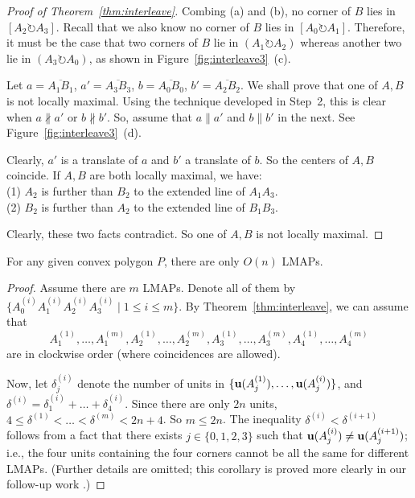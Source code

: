 \documentclass{ws-ijcga}
\begin{document}
\begin{proof}[Proof of Theorem~\ref{thm:interleave}]
\smallskip Combing (a) and (b), no corner of $B$ lies in $[A_2\circlearrowright A_3]$.
Recall that we also know no corner of $B$ lies in $[A_0\circlearrowright A_1]$.
Therefore, it must be the case that two corners of $B$ lie in $(A_1\circlearrowright A_2)$
 whereas another two lie in $(A_3\circlearrowright A_0)$, as shown in Figure~\ref{fig:interleave3}~(c).

\medskip Let $a=\overline{A_1B_1}$, $a'=\overline{A_3B_3}$, $b=\overline{A_0B_0}$, $b'=\overline{A_2B_2}$.
We shall prove that one of $A,B$ is not locally maximal.
Using the technique developed in Step~2, this is clear when $a\nparallel a'$ or $b\nparallel b'$.
So, assume that $a\parallel a'$ and $b\parallel b'$ in the next. See Figure~\ref{fig:interleave3}~(d).

\smallskip Clearly, $a'$ is a translate of $a$ and $b'$ a translate of $b$. So the centers of $A,B$ coincide.
If $A,B$ are both locally maximal, we have:\\
(1) $A_2$ is further than $B_2$ to the extended line of $A_1A_3$.\\
(2) $B_2$ is further than $A_2$ to the extended line of $B_1B_3$.

Clearly, these two facts contradict. So one of $A,B$ is not locally maximal.
\end{proof}

\begin{corollary}\label{corol:count}
For any given convex polygon $P$, there are only $O(n)$ LMAPs.
\end{corollary}

\begin{proof}
Assume there are $m$ LMAPs. Denote all of them by $\{A^{(i)}_0A^{(i)}_1A^{(i)}_2A^{(i)}_3\mid 1\leq i \leq m\}$.
By Theorem~\ref{thm:interleave}, we can assume that
$$A^{(1)}_1, \ldots, A^{(m)}_1,A^{(1)}_2, \ldots, A^{(m)}_2,A^{(1)}_3, \ldots, A^{(m)}_3, A^{(1)}_4, \ldots, A^{(m)}_4$$
are in clockwise order (where coincidences are allowed).

Now, let $\delta^{(i)}_j$ denote the number of units in $\{\mathbf{u}(A^{(1)}_j),\ldots,\mathbf{u}(A^{(i)}_j)\}$, and $\delta^{(i)}=\delta^{(i)}_1+\ldots+\delta^{(i)}_4$.
Since there are only $2n$ units, $4\leq \delta^{(1)}<\ldots<\delta^{(m)}< 2n+4$. So $m\leq 2n$.
The inequality $\delta^{(i)}<\delta^{(i+1)}$ follows from a fact that there exists $j\in \{0,1,2,3\}$ such that $\mathbf{u}(A^{(i)}_j)\neq \mathbf{u}(A^{(i+1)}_j)$;
i.e., the four units containing the four corners cannot be all the same for different LMAPs. (Further details are omitted;
    this corollary is proved more clearly in our follow-up work \cite{followup-MAP-arxiv15}.)
 \end{proof}
\end{document}
